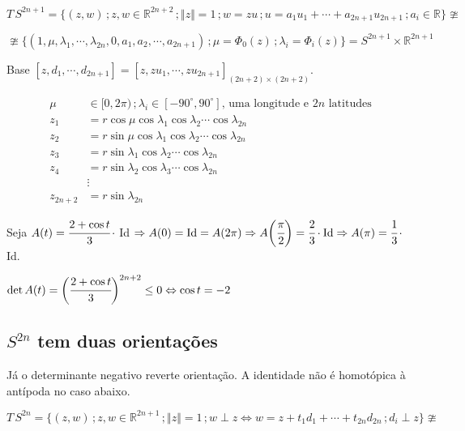 \documentclass[10pt,a4paper]{article}
\begin{document}
		\vspace{3mm}

		$T\,S^{2n + 1} = \{ (z, w) \,; z, w \in \mathbb{R}^{2n + 2} \,; \Vert z \Vert = 1\,; w = zu \,; u = a_1 u_1 + \cdots + a_{2n + 1} u_{2n + 1} \,; a_i \in \mathbb{R} \} \ncong$

		$\ncong \{ (1, \mu, \lambda_1, \cdots, \lambda_{2n}, 0, a_1, a_2, \cdots, a_{2n + 1}) \,; \mu = \Phi_0(z) \,; \lambda_i = \Phi_i(z) \} = S^{2n + 1} \times \mathbb{R}^{2n + 1}$

		Base $[z, d_1, \cdots, d_{2n + 1}] = [z, zu_1, \cdots, zu_{2n + 1}]_{(2n + 2) \times (2n + 2)}$.

		\begin{align*}
		\mu &\in [0, 2\pi) \,; \lambda_i \in [-90^\circ, 90^\circ] \text{, uma longitude e }2n\text{ latitudes} \\
		z_1 &= r \cos \mu \cos \lambda_1 \cos \lambda_2 \cdots \cos \lambda_{2n} \\
		z_2 &= r \sin \mu \cos \lambda_1 \cos \lambda_2 \cdots \cos \lambda_{2n} \\
		z_3 &= r \sin \lambda_1 \cos \lambda_2 \cdots \cos \lambda_{2n} \\
		z_4 &= r \sin \lambda_2 \cos \lambda_3 \cdots \cos \lambda_{2n} \\
		&\vdots \\
		z_{2n + 2} &= r \sin \lambda_{2n}
		\end{align*}

		Seja $A(t) = \cfrac{2 + \cos t}{3}\, \cdot $ Id $\Rightarrow A(0) = \text{Id} = A(2\pi) \Rightarrow A\bigg( \cfrac{\pi}{2} \bigg) = \cfrac{2}{3} \cdot\text{Id}\Rightarrow A(\pi) = \cfrac{1}{3}\, \cdot$ Id.

		$\det A(t) = \bigg( \cfrac{2 + \cos t}{3} \bigg)^{2n+2} \le 0 \Leftrightarrow \cos t = -2$

		\subsection{$S^{2n}$ tem duas orienta\c{c}\~oes}
		\begin{flushright}
		\end{flushright}

		J\'a o determinante negativo reverte orienta\c{c}\~ao. A identidade n\~ao \'e homot\'opica \`a ant\'ipoda no caso abaixo.

		$T\,S^{2n} = \{ (z, w) \,; z, w \in \mathbb{R}^{2n + 1} \,; \Vert z \Vert = 1\,; w \perp z \Leftrightarrow w = z + t_1 d_1 + \cdots + t_{2n} d_{2n} \,; d_i \perp z \} \ncong$
\end{document}
